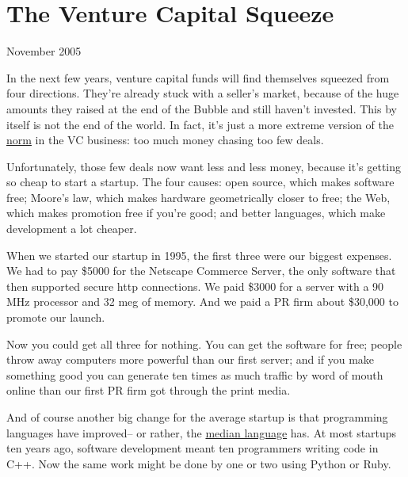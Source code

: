 \chapter{The Venture Capital Squeeze}


            
              
                

November 2005

In the next few years, venture
                  capital funds will find themselves squeezed from four
                  directions. They're already stuck with a seller's market,
                  because of the huge amounts they raised at the end of the
                  Bubble and still haven't invested. This by itself is not the
                  end of the world. In fact, it's just a more extreme version of
                  the
                  \href{http://www.archub.org/dilbertvc.gif}{norm}
                  in the VC business: too much money chasing too few deals.

Unfortunately,
                  those few deals now want less and less money, because it's
                  getting so cheap to start a startup. The four causes: open
                  source, which makes software free; Moore's law, which makes
                  hardware geometrically closer to free; the Web, which makes
                  promotion free if you're good; and better languages, which
                  make development a lot cheaper.

When we started our
                  startup in 1995, the first three were our biggest expenses. We
                  had to pay \$5000 for the Netscape Commerce Server, the only
                  software that then supported secure http connections. We paid
                  \$3000 for a server with a 90 MHz processor and 32 meg of
                  memory. And we paid a PR firm about \$30,000 to promote our
                  launch.

Now you could get all three for nothing.
                  You can get the software for free; people throw away computers
                  more powerful than our first server; and if you make something
                  good you can generate ten times as much traffic by word of
                  mouth online than our first PR firm got through the print
                  media.

And of course another big change for the
                  average startup is that programming languages have improved--
                  or rather, the \href{http://www.paulgraham.com/avg.html}{median language} has. At
                  most startups ten years ago, software development meant ten
                  programmers writing code in C++. Now the same work might be
                  done by one or two using Python or Ruby.

